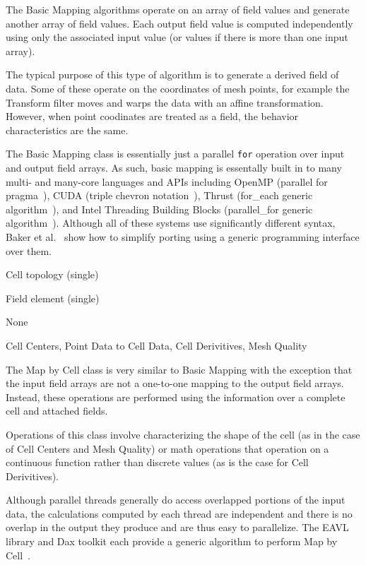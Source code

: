 \documentclass{sig-alternate}
\newcommand*{\lcite}[1]{~\cite{#1}}
\newcommand*{\scite}[1]{~\cite{#1}}
\newcommand{\etal}{et al.}
\newcommand{\algclass}[1]{\textsf{#1}}
\newcommand{\alg}[1]{#1}
\newcommand{\algorithmclasssection}[1]{
  \vspace{\baselineskip}\noindent{\large\textbf{\algclass{#1}}}}
\newcommand{\algorithmclass}[5]{
  \algorithmclasssection{#1} %
  \vspace{-.4\baselineskip}
  \begin{description}[leftmargin=9em,style=nextline,noitemsep]
    \raggedright
  \item[Input] #2
  \item[Output] #3
  \item[Interdependence] #4
  \item[Algorithms] #5
  \end{description}
}
\begin{document}
\noindent
The \algclass{Basic Mapping} algorithms operate on an array of field values
and generate another array of field values. Each output field value is
computed independently using only the associated input value (or values if
there is more than one input array).

The typical purpose of this type of algorithm is to generate a derived
field of data. Some of these operate on the coordinates of mesh points, for
example the \alg{Transform} filter moves and warps the data with an affine
transformation. However, when point coodinates are treated as a field, the
behavior characteristics are the same.

The \algclass{Basic Mapping} class is essentially just a parallel
\texttt{for} operation over input and output field arrays. As such, basic
mapping is essentally built in to many multi- and many-core languages and
APIs including OpenMP (parallel for pragma\lcite{Quinn2004}), CUDA (triple
chevron notation\lcite{Sanders2011}), Thrust (for\_each generic
algorithm\lcite{Thrust}), and Intel Threading Building Blocks
(parallel\_for generic algorithm\lcite{TBB}). Although all of these systems
use significantly different syntax, Baker \etal\scite{Baker2010} show how
to simplify porting using a generic programming interface over them.


\algorithmclass{Map by Cell}
               {Cell topology (single)} %
               {Field element (single)} %
               {None} %
               {Cell Centers, Point Data to Cell Data, Cell Derivitives,
                 Mesh Quality}

\noindent
The \algclass{Map by Cell} class is very similar to \algclass{Basic
  Mapping} with the exception that the input field arrays are not a
one-to-one mapping to the output field arrays. Instead, these operations
are performed using the information over a complete cell and attached
fields.

Operations of this class involve characterizing the shape of the cell (as
in the case of \alg{Cell Centers} and \alg{Mesh Quality}) or math
operations that operation on a continuous function rather than discrete
values (as is the case for \alg{Cell Derivitives}).

Although parallel threads generally do access overlapped portions of the
input data, the calculations computed by each thread are independent and
there is no overlap in the output they produce and are thus easy to
parallelize. The EAVL library and Dax toolkit each provide a generic
algorithm to perform \algclass{Map by Cell}\lcite{EAVL,Moreland2011:LDAV}.
\end{document}
